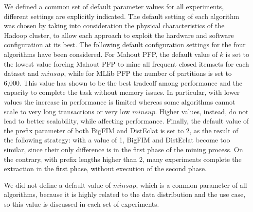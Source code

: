 We defined a common set of default parameter values for all experiments,
different settings are explicitly indicated.
The default setting of each algorithm was chosen by taking into consideration
the physical characteristics of the Hadoop cluster,
to allow each approach to exploit the hardware and software configuration at its best.
The following default configuration settings for the four algorithms
have been considered.
For Mahout PFP, the default value of $k$ is set to the lowest value forcing
Mahout PFP to mine all frequent closed itemsets for each dataset and $minsup$,
while for MLlib PFP the number of partitions is set to 6,000.
This value has shown to be the best tradeoff among performance
and the capacity to complete the task without memory issues.
In particular, with lower values the increase in performance is limited whereas
some algorithms cannot scale to very long transactions or very low $minsup$.
Higher values, instead, do not lead to better scalability, while affecting performance.
Finally, the default value
of the prefix parameter of both BigFIM and DistEclat is set to 2,
as the result of the following strategy:
with a value of 1,
BigFIM and DistEclat become too similar, since their only difference is in the
first phase of the mining process.
On the contrary, with prefix lengths higher than 2,
many experiments complete the extraction in the first phase,
without execution of the second phase.

We did not define a default value of $minsup$,
which is a common parameter of
all algorithms, because it is highly related to the data distribution and the
use case, so this value is discussed in each set of experiments.




